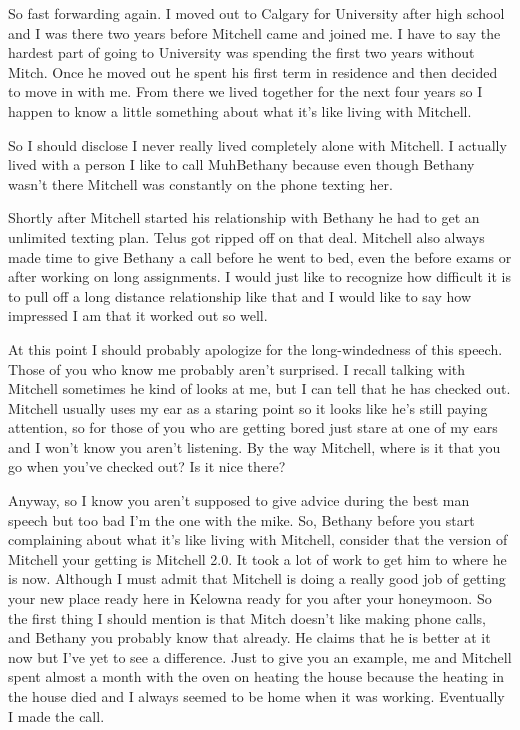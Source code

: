 So fast forwarding again. I moved out to Calgary for University after high school and I was there two years before Mitchell came and joined me. I have to say the hardest part of going to University was spending the first two years without Mitch. Once he moved out he spent his first term in residence and then decided to move in with me. From there we lived together for the next four years so I happen to know a little something about what it's like living with Mitchell.

So I should disclose I never really lived completely alone with Mitchell. I actually lived with a person I like to call MuhBethany because even though Bethany wasn't there Mitchell was constantly on the phone texting her.

Shortly after Mitchell started his relationship with Bethany he had to get an unlimited texting plan. Telus got ripped off on that deal. Mitchell also always made time to give Bethany a call before he went to bed, even the before exams or after working on long assignments. I would just like to recognize how difficult it is to pull off a long distance relationship like that and I would like to say how impressed I am that it worked out so well.

At this point I should probably apologize for the long-windedness of this speech. Those of you who know me probably aren't surprised. I recall talking with Mitchell sometimes he kind of looks at me, but I can tell that he has checked out. Mitchell usually uses my ear as a staring point so it looks like he's still paying attention, so for those of you who are getting bored just stare at one of my ears and I won't know you aren't listening. By the way Mitchell, where is it that you go when you've checked out? Is it nice there?

Anyway, so I know you aren't supposed to give advice during the best man speech but too bad I'm the one with the mike. So, Bethany before you start complaining about what it's like living with Mitchell, consider that the version of Mitchell your getting is Mitchell 2.0. It took a lot of work to get him to where he is now. Although I must admit that Mitchell is doing a really good job of getting your new place ready here in Kelowna ready for you after your honeymoon. So the first thing I should mention is that Mitch doesn't like making phone calls, and Bethany you probably know that already. He claims that he is better at it now but I've yet to see a difference. Just to give you an example, me and Mitchell spent almost a month with the oven on heating the house because the heating in the house died and I always seemed to be home when it was working. Eventually I made the call.

